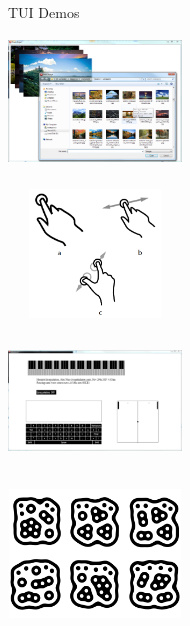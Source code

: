 \begin{frame}%
\begin{block}{TUI Demos}
\begin{minipage}{1.0\linewidth}
\begin{center}
\begin{minipage}{.49\linewidth}
\begin{center}
\includegraphics[height=34mm, width=46mm]{images/image_app.png}\\$\;$\\
\includegraphics[height=34mm, width=46mm]{images/touch.png}
\end{center}
\end{minipage}%
\begin{minipage}{.49\linewidth}
\begin{center}
\includegraphics[height=34mm, width=46mm]{images/fiducials.png}\\$\;$\\
\includegraphics[height=34mm, width=46mm]{images/fiducial_markers.png} 
\end{center}
\end{minipage}
\end{center}
\end{minipage}
\end{block}
\end{frame}

